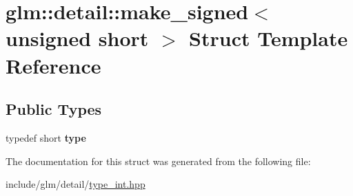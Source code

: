 \hypertarget{structglm_1_1detail_1_1make__signed_3_01unsigned_01short_01_4}{}\section{glm\+:\+:detail\+:\+:make\+\_\+signed$<$ unsigned short $>$ Struct Template Reference}
\label{structglm_1_1detail_1_1make__signed_3_01unsigned_01short_01_4}
\subsection*{Public Types}
\begin{DoxyCompactItemize}
\item 
\mbox{\label{structglm_1_1detail_1_1make__signed_3_01unsigned_01short_01_4_af5793ac48501a8fb2be1d5aa55afff67}} 
typedef short {\bfseries type}
\end{DoxyCompactItemize}


The documentation for this struct was generated from the following file\+:\begin{DoxyCompactItemize}
\item 
include/glm/detail/\hyperlink{type__int_8hpp}{type\+\_\+int.\+hpp}\end{DoxyCompactItemize}
